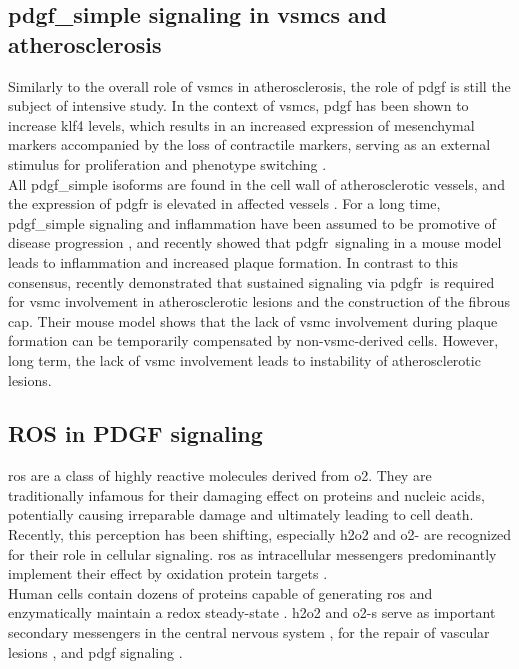     \subsection{\ac{pdgf_simple} signaling in \acp{vsmc} and atherosclerosis}
    \label{subsec:pdgf_in_disease}
    Similarly to the overall role of \acp{vsmc} in atherosclerosis, the role of \ac{pdgf} is still the subject of intensive study. In the context of \acp{vsmc}, \ac{pdgf} has been shown to increase \ac{klf4} levels, which results in an increased expression of mesenchymal markers accompanied by the loss of contractile markers, serving as an external stimulus for proliferation and phenotype switching \cite{yapSixShadesVascular2021}.\\
    All \ac{pdgf_simple} isoforms are found in the cell wall of atherosclerotic vessels, and the expression of \ac{pdgfr} is elevated in affected vessels \cite{huTargetingPlateletderivedGrowth2015}. For a long time, \ac{pdgf_simple} signaling and inflammation have been assumed to be promotive of disease progression \cite{andraeRolePlateletderivedGrowth2008, chenPlateletderivedGrowthFactors2013, huTargetingPlateletderivedGrowth2015}, and recently \textcite{hePDGFRbetaSignallingRegulates2015} showed that \ac{pdgfr}\beta~signaling in a mouse model leads to inflammation and increased plaque formation. In contrast to this consensus, \textcite{newmanMultipleCellTypes2021} recently demonstrated that sustained signaling via \ac{pdgfr}\beta~is required for \ac{vsmc} involvement in atherosclerotic lesions and the construction of the fibrous cap. Their mouse model shows that the lack of \ac{vsmc} involvement during plaque formation can be temporarily compensated by non-\ac{vsmc}-derived cells. However, long term, the lack of \ac{vsmc} involvement leads to instability of atherosclerotic lesions.

    \subsection{ROS in PDGF signaling}
    \label{subsec:ROS_signaling}
    \Ac{ros} are a class of highly reactive molecules derived from \ac{o2}. They are traditionally infamous for their damaging effect on proteins and nucleic acids, potentially causing irreparable damage and ultimately leading to cell death. Recently, this perception has been shifting, especially \ac{h2o2} and \ac{o2-} are recognized for their role in cellular signaling. \cite{siesReactiveOxygenSpecies2020} \ac{ros} as intracellular messengers predominantly implement their effect by oxidation protein targets \cite{zeidaCatalysisPeroxideReduction2019}. \\
    Human cells contain dozens of proteins capable of generating \ac{ros} and enzymatically maintain a redox steady-state \cite{siesReactiveOxygenSpecies2020}. \ac{h2o2} and \acp{o2-} serve as important secondary messengers in the central nervous system \cite{nayerniaNewInsightsNOX2014}, for the repair of vascular lesions \cite{andraeRolePlateletderivedGrowth2008}, and \ac{pdgf} signaling \cite{sundaresanRequirementGenerationH2O21995, bouziguesRegulationROSResponse2014a}.


